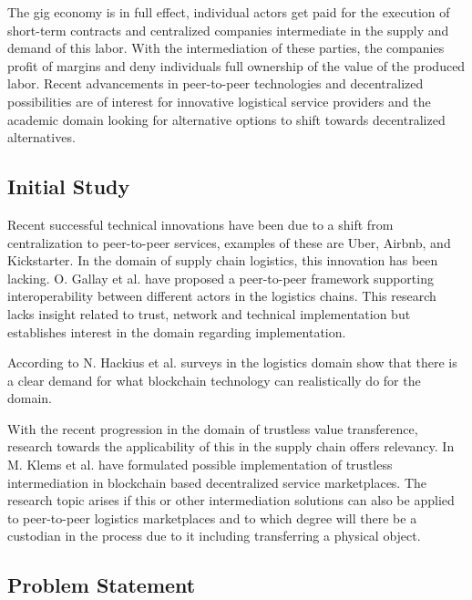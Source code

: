 The gig economy is in full effect, individual actors get paid for the execution of short-term contracts and centralized companies intermediate in the supply and demand of this labor. With the intermediation of these parties, the companies profit of margins and deny individuals full ownership of the value of the produced labor. Recent advancements in peer-to-peer technologies and decentralized possibilities are of interest for innovative logistical service providers and the academic domain looking for alternative options to shift towards decentralized alternatives.\par

\subsection{Initial Study}

Recent successful technical innovations have been due to a shift from centralization to peer-to-peer services, examples of these are Uber, Airbnb, and Kickstarter. In the domain of supply chain logistics, this innovation has been lacking. O. Gallay et al. \cite{peer-to-peerDecentralizedLogistics} have proposed a peer-to-peer framework supporting interoperability between different actors in the logistics chains. This research lacks insight related to trust, network and technical implementation but establishes interest in the domain regarding implementation. \par
According to N. Hackius et al. \cite{hackius2017blockchain} surveys in the logistics domain show that there is a clear demand for what blockchain technology can realistically do for the domain. \par
With the recent progression in the domain of trustless value transference, research towards the applicability of this in the supply chain offers relevancy. In \cite{trustlessIntermediationInBCServiceMarket} M. Klems et al. have formulated possible implementation of trustless intermediation in blockchain based decentralized service marketplaces. The research topic arises if this or other intermediation solutions can also be applied to peer-to-peer logistics marketplaces and to which degree will there be a custodian in the process due to it including transferring a physical object.

\subsection{Problem Statement}

